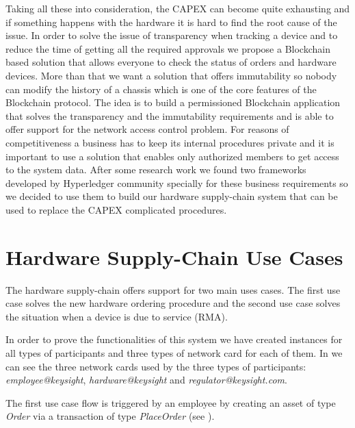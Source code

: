 Taking all these into consideration, the CAPEX can become quite exhausting and if something happens with the hardware it is hard to find the root cause of the issue. In order to solve the issue of transparency when tracking a device and to reduce the time of getting all the required approvals we propose a Blockchain based solution that allows everyone to check the status of orders and hardware devices. More than that we want a solution that offers immutability so nobody can modify the history of a chassis which is one of the core features of the Blockchain protocol.
The idea is to build a permissioned Blockchain application that solves the transparency and the immutability requirements and is able to offer support for the network access control problem.
For reasons of competitiveness a business has to keep its internal procedures private and it is important to use a solution that enables only authorized members to get access to the system data.
After some research work we found two frameworks developed by Hyperledger community specially for these business requirements so we decided to use them to build our hardware supply-chain system that can be used to replace the CAPEX complicated procedures.

\section{Hardware Supply-Chain Use Cases}
\label{sub-sec:chapter4-section1}
The hardware supply-chain offers support for two main uses cases. The first use case solves the new hardware ordering procedure and the second use case solves the situation when a device is due to service (RMA).

In order to prove the functionalities of this system we have created instances for all types of participants and three types of network card for each of them. 
In  we can see the three network cards used by the three types of participants: \emph{employee@keysight}, \emph{hardware@keysight} and \emph{regulator@keysight.com}.


The first use case flow is triggered by an employee by creating an asset of type \emph{Order} via a transaction of type \emph{PlaceOrder} (see ). 


